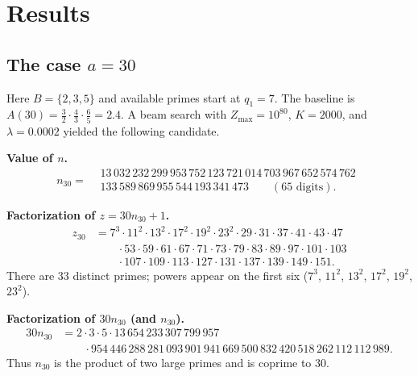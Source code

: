 \documentclass[12pt]{amsart}
\theoremstyle{definition}
\begin{document}
\section{Results}

\subsection{The case $a = 30$}

Here $B = \{2,3,5\}$ and available primes start at $q_1 = 7$.
The baseline is $A(30) = \frac{3}{2}\cdot\frac{4}{3}\cdot\frac{6}{5} = 2.4$.
A beam search with $Z_{\max} = 10^{80}$, $K = 2000$, and $\lambda = 0.0002$
yielded the following candidate.

\medskip
\noindent
\textbf{Value of $n$.}
\[
n_{30}=
\begin{aligned}
&13\,032\,232\,299\,953\,752\,123\,721\,014\,703\,967\,652\,574\,762\,\\
&133\,589\,869\,955\,544\,193\,341\,473 \qquad (\text{65 digits}).
\end{aligned}
\]

\medskip
\noindent
\textbf{Factorization of $z = 30n_{30}+1$.}
\begin{align*}
z_{30} &= 7^{3} \cdot 11^{2} \cdot 13^{2} \cdot 17^{2} \cdot 19^{2} \cdot 23^{2}
          \cdot 29 \cdot 31 \cdot 37 \cdot 41 \cdot 43 \cdot 47 \\
       &\qquad \cdot 53 \cdot 59 \cdot 61 \cdot 67 \cdot 71 \cdot 73 \cdot 79
          \cdot 83 \cdot 89 \cdot 97 \cdot 101 \cdot 103 \\
       &\qquad \cdot 107 \cdot 109 \cdot 113 \cdot 127 \cdot 131 \cdot 137
          \cdot 139 \cdot 149 \cdot 151 .
\end{align*}
There are 33 distinct primes; powers appear on the first six
($7^3$, $11^2$, $13^2$, $17^2$, $19^2$, $23^2$).

\medskip
\noindent
\textbf{Factorization of $30n_{30}$ (and $n_{30}$).}
\[
\begin{aligned}
30n_{30} &= 2 \cdot 3 \cdot 5
           \cdot 13\,654\,233\,307\,799\,957 \\
         &\qquad \cdot 954\,446\,288\,281\,093\,901\,941\,669\,500\,832\,420\,
             518\,262\,112\,112\,989 .
\end{aligned}
\]
Thus $n_{30}$ is the product of two large primes and is coprime to $30$.
\end{document}
